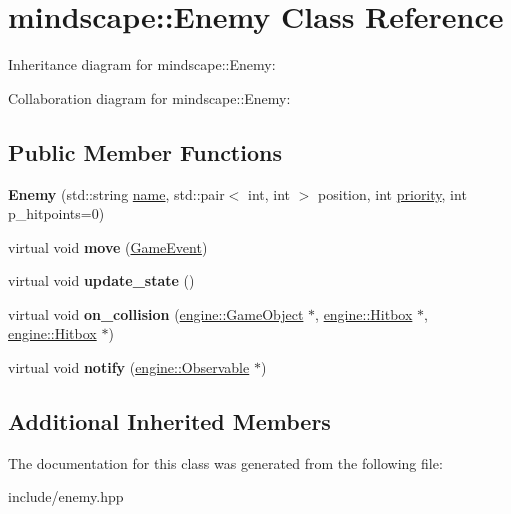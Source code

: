 \hypertarget{classmindscape_1_1_enemy}{}\section{mindscape\+:\+:Enemy Class Reference}
\label{classmindscape_1_1_enemy}


Inheritance diagram for mindscape\+:\+:Enemy\+:


Collaboration diagram for mindscape\+:\+:Enemy\+:
\subsection*{Public Member Functions}
\begin{DoxyCompactItemize}
\item 
{\bfseries Enemy} (std\+::string \hyperlink{classengine_1_1_game_object_a1f104f7af4f351e6d3278319762c9fe5}{name}, std\+::pair$<$ int, int $>$ position, int \hyperlink{classengine_1_1_game_object_a159ecaca30229e302793b11a75bd13c2}{priority}, int p\+\_\+hitpoints=0)\hypertarget{classmindscape_1_1_enemy_a5264b10dcb340844c3ac170553764de6}{}\label{classmindscape_1_1_enemy_a5264b10dcb340844c3ac170553764de6}

\item 
virtual void {\bfseries move} (\hyperlink{class_game_event}{Game\+Event})\hypertarget{classmindscape_1_1_enemy_aa2843767304d994345cb9a4415b4b489}{}\label{classmindscape_1_1_enemy_aa2843767304d994345cb9a4415b4b489}

\item 
virtual void {\bfseries update\+\_\+state} ()\hypertarget{classmindscape_1_1_enemy_a97aa2c11a763b2cbd13736469f8b7519}{}\label{classmindscape_1_1_enemy_a97aa2c11a763b2cbd13736469f8b7519}

\item 
virtual void {\bfseries on\+\_\+collision} (\hyperlink{classengine_1_1_game_object}{engine\+::\+Game\+Object} $\ast$, \hyperlink{classengine_1_1_hitbox}{engine\+::\+Hitbox} $\ast$, \hyperlink{classengine_1_1_hitbox}{engine\+::\+Hitbox} $\ast$)\hypertarget{classmindscape_1_1_enemy_a4c188f54ae13237a434774d9ad24b49e}{}\label{classmindscape_1_1_enemy_a4c188f54ae13237a434774d9ad24b49e}

\item 
virtual void {\bfseries notify} (\hyperlink{classengine_1_1_observable}{engine\+::\+Observable} $\ast$)\hypertarget{classmindscape_1_1_enemy_a790998a9c734d808f8a4834b303b8a67}{}\label{classmindscape_1_1_enemy_a790998a9c734d808f8a4834b303b8a67}

\end{DoxyCompactItemize}
\subsection*{Additional Inherited Members}


The documentation for this class was generated from the following file\+:\begin{DoxyCompactItemize}
\item 
include/enemy.\+hpp\end{DoxyCompactItemize}
